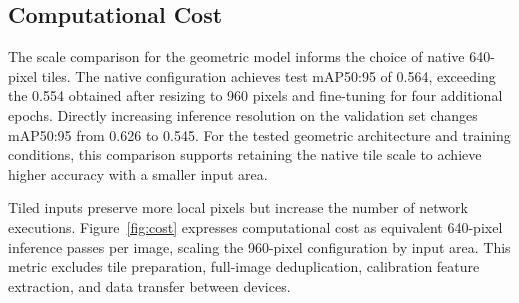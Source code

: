 \documentclass[11pt,a4paper]{article}
\begin{document}
\subsection{Computational Cost}

The scale comparison for the geometric model informs the choice of native 640-pixel tiles. The native configuration achieves test mAP50:95 of 0.564, exceeding the 0.554 obtained after resizing to 960 pixels and fine-tuning for four additional epochs. Directly increasing inference resolution on the validation set changes mAP50:95 from 0.626 to 0.545. For the tested geometric architecture and training conditions, this comparison supports retaining the native tile scale to achieve higher accuracy with a smaller input area.

Tiled inputs preserve more local pixels but increase the number of network executions. Figure~\ref{fig:cost} expresses computational cost as equivalent 640-pixel inference passes per image, scaling the 960-pixel configuration by input area. This metric excludes tile preparation, full-image deduplication, calibration feature extraction, and data transfer between devices.
\end{document}
